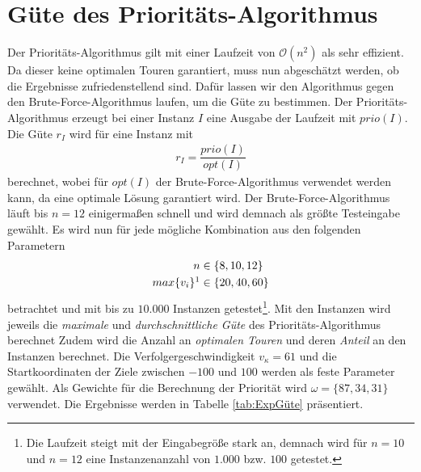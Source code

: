 \documentclass[german,version-2019-11]{uzl-thesis}
\begin{document}
\section{Güte des Prioritäts-Algorithmus}
Der Prioritäts-Algorithmus gilt mit einer Laufzeit von $\mathcal{O}(n^2)$ als sehr effizient. Da dieser keine optimalen Touren garantiert, muss nun abgeschätzt werden, ob die Ergebnisse zufriedenstellend sind. Dafür lassen wir den Algorithmus gegen den Brute-Force-Algorithmus laufen, um die Güte zu bestimmen. Der Prioritäts-Algorithmus erzeugt bei einer Instanz $I$ eine Ausgabe der Laufzeit mit $prio(I)$. Die Güte $r_I$ wird für eine Instanz mit
\begin{align*}
r_I = \dfrac{prio(I)}{opt(I)}
\end{align*} \noindent
berechnet, wobei für $opt(I)$ der Brute-Force-Algorithmus verwendet werden kann, da eine optimale Lösung garantiert wird. Der Brute-Force-Algorithmus läuft bis $n=12$ einigermaßen schnell und wird demnach als größte Testeingabe gewählt. Es wird nun für jede mögliche Kombination aus den folgenden Parametern
\begin{align*}
n&\in\{8,10,12\}\\
max\{v_{i}\}\footnotemark&\in\{20,40,60\} 
\end{align*}
\noindent betrachtet und mit bis zu $10.000$ Instanzen getestet\footnote{Die Laufzeit steigt mit der Eingabegröße stark an, demnach wird für $n=10$ und $n=12$ eine Instanzenanzahl von $1.000$ bzw. $100$ getestet.}. Mit den Instanzen wird jeweils die \emph{maximale} und \emph{durchschnittliche Güte} des Prioritäts-Algorithmus berechnet Zudem wird die Anzahl an \emph{optimalen Touren} und deren \emph{Anteil} an den Instanzen berechnet. Die Verfolgergeschwindigkeit $v_{\kappa}=61$ und die Startkoordinaten der Ziele zwischen $-100$ und $100$ werden als feste Parameter gewählt. Als Gewichte für die Berechnung der Priorität wird $\omega = \{87,34,31\}$ verwendet. Die Ergebnisse werden in Tabelle \ref{tab:ExpGüte} präsentiert.
\end{document}
